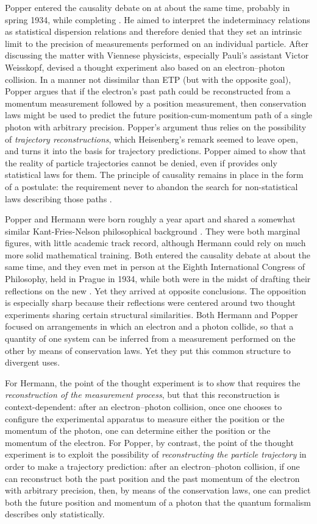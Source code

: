 \documentclass[final,12pt]{article}
\newcommand{\LdF}{\bt{Logik der Forschung}\xspace}
\newcommand{\TE}{thought experiment\xspace}
\newcommand{\IR}{indeterminacy relations\xspace}
\begin{document}
Popper entered the causality debate on \qm at about the same time, probably in spring 1934, while completing \LdF \citep{Giovanelli2026}. He aimed to interpret the \IR as statistical dispersion relations and therefore denied that they set an intrinsic limit to the precision of measurements performed on an individual particle. After discussing the matter with Viennese physicists, especially Pauli's assistant Victor Weisskopf, \citet{Popper1934} devised a \TE also based on an electron--photon collision. In a manner not dissimilar than ETP (but with the opposite goal), Popper argues that if the electron's past path could be reconstructed from a momentum measurement followed by a position measurement, then conservation laws might be used to predict the future position-cum-momentum path of a single photon with arbitrary precision. Popper's argument thus relies on the possibility of \emph{trajectory reconstructions}, which Heisenberg's  remark seemed to leave open, and turns it into the basis for trajectory predictions. Popper aimed to show that the reality of particle trajectories cannot be denied, even if \qm provides only statistical laws for them. The principle of causality remains in place in the form of a postulate: the requirement never to abandon the search for non-statistical laws describing those paths \citep[\S78]{Popper1935}.

Popper and Hermann were born roughly a year apart and shared a somewhat similar Kant-Fries-Nelson philosophical background \citep{Milkov2012}. They were both marginal figures, with little academic track record, although Hermann could rely on much more solid mathematical training. Both entered the causality debate at about the same time, and they even met in person at the Eighth International Congress of Philosophy, held in Prague in 1934, while both were in the midst of drafting their reflections on the new \qm. Yet they arrived at opposite conclusions. The opposition is especially sharp because their reflections were centered around two thought experiments sharing certain structural similarities. Both Hermann and Popper focused on arrangements in which an electron and a photon collide, so that a quantity of one system can be inferred from a measurement performed on the other by means of conservation laws.     Yet they put this common structure to divergent uses.

For Hermann, the point of the \TE is to show that \qm requires the \emph{reconstruction of the measurement process}, but that this reconstruction is context-dependent: after an electron--photon collision, once one chooses to configure the experimental apparatus to measure either the position or the momentum of the photon, one can determine either the position or the momentum of the electron. For Popper, by contrast, the point of the \TE is to exploit the possibility of \emph{reconstructing the particle trajectory} in order to make a trajectory prediction: after an electron--photon collision, if one can reconstruct both the past position and the past momentum of the electron with arbitrary precision, then, by means of the conservation laws, one can predict both the future position and momentum of a photon that the quantum formalism describes only statistically.
\end{document}
